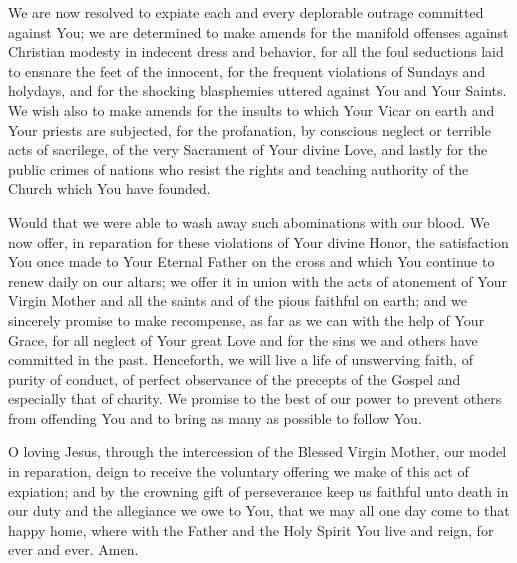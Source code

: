 \documentclass[12pt]{article}
\begin{document}
We are now resolved to expiate each and every deplorable outrage committed against You; we are determined to make amends for the manifold offenses against Christian modesty in indecent dress and behavior, for all the foul seductions laid to ensnare the feet of the innocent, for the frequent violations of Sundays and holydays, and for the shocking blasphemies uttered against You and Your Saints.
We wish also to make amends for the insults to which Your Vicar on earth and Your priests are subjected, for the profanation, by conscious neglect or terrible acts of sacrilege, of the very Sacrament of Your divine Love, and lastly for the public crimes of nations who
resist the rights and teaching authority of the Church which You have founded.

Would that we were able to wash away such abominations with our blood.
We now offer, in reparation for these violations of Your divine Honor, the satisfaction You once made to Your Eternal Father on the cross and which You continue to renew daily on our altars;
we offer it in union with the acts of atonement of Your Virgin Mother and all the saints and of the pious faithful on earth;
and we sincerely promise to make recompense, as far as we can with the help of Your Grace, for all neglect of Your great Love and for the sins we and others have committed in the past.
Henceforth, we will live a life of unswerving faith, of purity of conduct, of perfect observance of the precepts of the Gospel and especially that of charity.
We promise to the best of our power to prevent others from offending You and to bring as many as possible to follow You.

O loving Jesus, through the intercession of the Blessed Virgin Mother, our model in reparation, deign to receive the voluntary offering we make of this act of expiation;
and by the crowning gift of perseverance keep us faithful unto death in our duty and the allegiance we owe to You, that we may all one day come to that happy home, where with the Father and the Holy Spirit You live and reign, for ever and ever. Amen.
\end{document}
